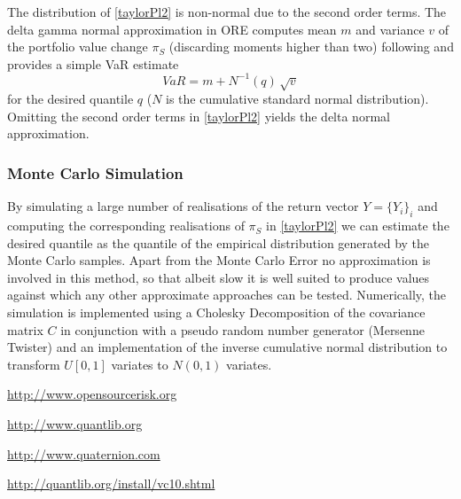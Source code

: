 \documentclass[12pt, a4paper]{article}
\begin{document}
{{\begin{appendix}
The distribution of \eqref{taylorPl2} is non-normal due to the second order terms. 
The delta gamma normal approximation in ORE computes mean $m$ and variance $v$ of the portfolio value change $\pi_S$ (discarding moments higher than two) following \cite{alexander} and provides a simple VaR estimate 
$$
VaR = m + N^{-1}(q)\,\sqrt{v}
$$
for the desired quantile $q$ ($N$ is the cumulative standard normal distribution). Omitting the second order terms in \eqref{taylorPl2} yields the delta normal approximation.
 
\subsubsection*{Monte Carlo Simulation}

By simulating a large number of realisations of the return vector $Y=\{ Y_i \}_i$ and computing the corresponding
realisations of $\pi_S$ in \eqref{taylorPl2} we can estimate the desired quantile as the quantile of the empirical
distribution generated by the Monte Carlo samples. Apart from the Monte Carlo Error no approximation is involved in this
method, so that albeit slow it is well suited to produce values against which any other approximate approaches can be tested. Numerically, the simulation is implemented using a Cholesky Decomposition
of the covariance matrix $C$ in conjunction with a pseudo random number generator (Mersenne Twister) and an
implementation of the inverse cumulative normal distribution to transform $U[0,1]$ variates to $N(0,1)$ variates.

\end{appendix}


\begin{thebibliography}{*}

 \url{http://www.opensourcerisk.org}

 \url{http://www.quantlib.org}
 
 \url{http://www.quaternion.com}

 \url{http://quantlib.org/install/vc10.shtml}



\end{thebibliography}}}
\end{document}
